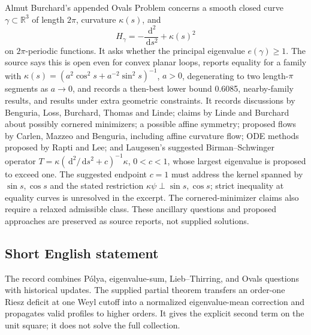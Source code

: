 \documentclass[11pt]{article}
\newcommand{\R}{\mathbb{R}}
\newcommand{\dd}{\,\mathrm{d}}
\begin{document}
Almut Burchard's appended Ovals Problem concerns a smooth closed curve \(\gamma\subset\R^3\) of length \(2\pi\), curvature \(\kappa(s)\), and
\[
 H_\gamma=-\frac{\dd^2}{\dd s^2}+\kappa(s)^2
\]
on \(2\pi\)-periodic functions. It asks whether the principal eigenvalue \(e(\gamma)\geq1\). The source says this is open even for convex planar loops, reports equality for a family with \(\kappa(s)=(a^2\cos^2s+a^{-2}\sin^2s)^{-1}\), \(a>0\), degenerating to two length-\(\pi\) segments as \(a\to0\), and records a then-best lower bound 0.6085, nearby-family results, and results under extra geometric constraints. It records discussions by Benguria, Loss, Burchard, Thomas and Linde; claims by Linde and Burchard about possibly cornered minimizers; a possible affine symmetry; proposed flows by Carlen, Mazzeo and Benguria, including affine curvature flow; ODE methods proposed by Rapti and Lee; and Laugesen's suggested Birman--Schwinger operator
\(T=\kappa(\dd^2/\dd s^2+c)^{-1}\kappa\), \(0<c<1\), whose largest eigenvalue is proposed to exceed one. The suggested endpoint \(c=1\) must address the kernel spanned by \(\sin s,\cos s\) and the stated restriction \(\kappa\psi\perp\sin s,\cos s\); strict inequality at equality curves is unresolved in the excerpt. The cornered-minimizer claims also require a relaxed admissible class. These ancillary questions and proposed approaches are preserved as source reports, not supplied solutions.
\subsection{Short English statement}
The record combines P\'olya, eigenvalue-sum, Lieb--Thirring, and Ovals questions with historical updates. The supplied partial theorem transfers an order-one Riesz deficit at one Weyl cutoff into a normalized eigenvalue-mean correction and propagates valid profiles to higher orders. It gives the explicit second term on the unit square; it does not solve the full collection.
\end{document}

